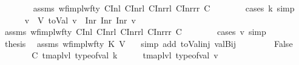 \begin{isabellebody}
\ \ \ \ \ \ \isamarkupfalse%
\ assms\ wf{\isacharunderscore}{\kern0pt}impl{\isacharunderscore}{\kern0pt}wf{\isacharunderscore}{\kern0pt}ty\ C{}Inl\ C{}Inrl\ C{}Inrrl\ C{}Inrrr\ C\isanewline
\ \ \ \ \ \ \isamarkupfalse%
\ {\isacharparenleft}{\kern0pt}cases\ k{\isacharsemicolon}{\kern0pt}\ simp{\isacharparenright}{\kern0pt}\isanewline
\ \ \ \ \isamarkupfalse%
\ v{\isacharprime}{\kern0pt}\ \ V{\isacharcolon}{\kern0pt}\ {\isachardoublequoteopen}toVal{}{}{}{}\ v\ {\isacharequal}{\kern0pt}\ Inr\ {\isacharparenleft}{\kern0pt}Inr\ {\isacharparenleft}{\kern0pt}Inr\ v{\isacharprime}{\kern0pt}{\isacharparenright}{\kern0pt}{\isacharparenright}{\kern0pt}{\isachardoublequoteclose}\isanewline
\ \ \ \ \ \ \isamarkupfalse%
\ assms\ wf{\isacharunderscore}{\kern0pt}impl{\isacharunderscore}{\kern0pt}wf{\isacharunderscore}{\kern0pt}ty\ C{}Inl\ C{}Inrl\ C{}Inrrl\ C{}Inrrr\ C\isanewline
\ \ \ \ \ \ \isamarkupfalse%
\ {\isacharparenleft}{\kern0pt}cases\ v{\isacharsemicolon}{\kern0pt}\ simp{\isacharparenright}{\kern0pt}\isanewline
\ \ \ \ \isamarkupfalse%
\ {\isacharquery}{\kern0pt}thesis\ \isamarkupfalse%
\ assms\ wf{\isacharunderscore}{\kern0pt}impl{\isacharunderscore}{\kern0pt}wf{\isacharunderscore}{\kern0pt}ty\ K\ V\ {\isachardoublequoteopen}{}{\isachardoublequoteclose}\ \isamarkupfalse%
\ {\isacharparenleft}{\kern0pt}simp\ add{\isacharcolon}{\kern0pt}\ toVal{}{}{}{}{\isacharunderscore}{\kern0pt}inj\ valBij{\isacharparenright}{\kern0pt}\isanewline
\ \ \isamarkupfalse%
\isanewline
\ \ \ \ \isamarkupfalse%
\ False\ \ \isanewline
\ \ \ \ \isamarkupfalse%
\ \isamarkupfalse%
\ C{\isacharcolon}{\kern0pt}\ {\isachardoublequoteopen}tmap{\isacharunderscore}{\kern0pt}lvl\ {\isacharparenleft}{\kern0pt}type{\isacharunderscore}{\kern0pt}of{\isacharunderscore}{\kern0pt}val\ k{\isacharparenright}{\kern0pt}\ {\isasymle}\ {}\ \ {\isasymand}\ \ tmap{\isacharunderscore}{\kern0pt}lvl\ {\isacharparenleft}{\kern0pt}type{\isacharunderscore}{\kern0pt}of{\isacharunderscore}{\kern0pt}val\ v{\isacharparenright}{\kern0pt}\ {\isacharequal}{\kern0pt}\ {}{\isachardoublequoteclose}\isanewline
\ \ \ \ \ \ \isamarkupfalse%

\end{isabellebody}
